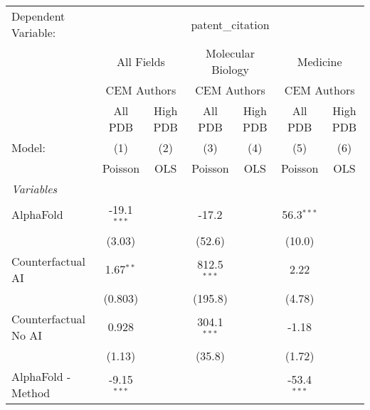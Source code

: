 \begingroup
\centering
\begin{tabular}{lcccccc}
   \tabularnewline \midrule \midrule
   Dependent Variable: & \multicolumn{6}{c}{patent\_citation}\\
 & \multicolumn{2}{c}{All Fields} & \multicolumn{2}{c}{Molecular Biology} & \multicolumn{2}{c}{Medicine} \\
\cmidrule(lr){2-3} \cmidrule(lr){4-5} \cmidrule(lr){6-7}
 & \multicolumn{2}{c}{CEM Authors} & \multicolumn{2}{c}{CEM Authors} & \multicolumn{2}{c}{CEM Authors} \\
\cmidrule(lr){2-3} \cmidrule(lr){4-5} \cmidrule(lr){6-7}
 & \multicolumn{1}{c}{All PDB} & \multicolumn{1}{c}{High PDB} & \multicolumn{1}{c}{All PDB} & \multicolumn{1}{c}{High PDB} & \multicolumn{1}{c}{All PDB} & \multicolumn{1}{c}{High PDB} \\
\cmidrule(lr){2-2} \cmidrule(lr){3-3} \cmidrule(lr){4-4} \cmidrule(lr){5-5} \cmidrule(lr){6-6} \cmidrule(lr){7-7}
   Model:                                                     & (1)           & (2)  & (3)            & (4)  & (5)           & (6)\\  
                                                              &  Poisson      & OLS  & Poisson        & OLS  & Poisson       & OLS\\  
   \midrule
   \emph{Variables}\\
   AlphaFold                                                  & -19.1$^{***}$ &      & -17.2          &      & 56.3$^{***}$  &   \\   
                                                              & (3.03)        &      & (52.6)         &      & (10.0)        &   \\   
   Counterfactual AI                                          & 1.67$^{**}$   &      & 812.5$^{***}$  &      & 2.22          &   \\   
                                                              & (0.803)       &      & (195.8)        &      & (4.78)        &   \\   
   Counterfactual No AI                                       & 0.928         &      & 304.1$^{***}$  &      & -1.18         &   \\   
                                                              & (1.13)        &      & (35.8)         &      & (1.72)        &   \\   
   AlphaFold - Method                                         & -9.15$^{***}$ &      &                &      & -53.4$^{***}$ &   \\   

\end{tabular}
